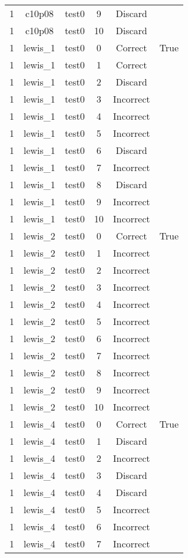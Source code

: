 \begin{longtable}{|c|c|c|c|c|c|}
1 & c10p08 & test0 & 9 & Discard &  \\ 
1 & c10p08 & test0 & 10 & Discard &  \\ 
1 & lewis\_1 & test0 & 0 & Correct & True \\ 
1 & lewis\_1 & test0 & 1 & Correct &  \\ 
1 & lewis\_1 & test0 & 2 & Discard &  \\ 
1 & lewis\_1 & test0 & 3 & Incorrect &  \\ 
1 & lewis\_1 & test0 & 4 & Incorrect &  \\ 
1 & lewis\_1 & test0 & 5 & Incorrect &  \\ 
1 & lewis\_1 & test0 & 6 & Discard &  \\ 
1 & lewis\_1 & test0 & 7 & Incorrect &  \\ 
1 & lewis\_1 & test0 & 8 & Discard &  \\ 
1 & lewis\_1 & test0 & 9 & Incorrect &  \\ 
1 & lewis\_1 & test0 & 10 & Incorrect &  \\ 
1 & lewis\_2 & test0 & 0 & Correct & True \\ 
1 & lewis\_2 & test0 & 1 & Incorrect &  \\ 
1 & lewis\_2 & test0 & 2 & Incorrect &  \\ 
1 & lewis\_2 & test0 & 3 & Incorrect &  \\ 
1 & lewis\_2 & test0 & 4 & Incorrect &  \\ 
1 & lewis\_2 & test0 & 5 & Incorrect &  \\ 
1 & lewis\_2 & test0 & 6 & Incorrect &  \\ 
1 & lewis\_2 & test0 & 7 & Incorrect &  \\ 
1 & lewis\_2 & test0 & 8 & Incorrect &  \\ 
1 & lewis\_2 & test0 & 9 & Incorrect &  \\ 
1 & lewis\_2 & test0 & 10 & Incorrect &  \\ 
1 & lewis\_4 & test0 & 0 & Correct & True \\ 
1 & lewis\_4 & test0 & 1 & Discard &  \\ 
1 & lewis\_4 & test0 & 2 & Incorrect &  \\ 
1 & lewis\_4 & test0 & 3 & Discard &  \\ 
1 & lewis\_4 & test0 & 4 & Discard &  \\ 
1 & lewis\_4 & test0 & 5 & Incorrect &  \\ 
1 & lewis\_4 & test0 & 6 & Incorrect &  \\ 
1 & lewis\_4 & test0 & 7 & Incorrect &  \\ 

\end{longtable}
